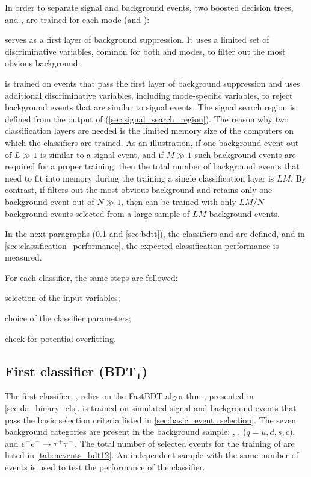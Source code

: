 In order to separate signal and background events, two boosted decision trees, \bdto and \bdtt, are trained for each mode (\BKpnn and \BKznn):
\bi
\item \bdto serves as a first layer of background suppression.
It uses a limited set of discriminative variables, common for both \BKpnn and \BKznn modes, to filter out the most obvious background.
\item \bdtt is trained on events that pass the first layer of background suppression and uses additional discriminative variables, including mode-specific variables, to reject background events that are similar to signal events.
The signal search region is defined from the output of \bdtt (\cref{sec:signal_search_region}).
\ei
The reason why two classification layers are needed is the limited memory size of the computers on which the classifiers are trained.
As an illustration, if one background event out of $L\gg1$ is similar to a signal event, and if $M\gg1$ such background events are required for a proper training, then the total number of background events that need to fit into memory during the training a single classification layer is $LM$.
By contrast, if \bdto filters out the most obvious background and retains only one background event out of $N\gg1$, then \bdtt can be trained with only $LM/N$ background events selected from a large sample of $LM$ background events.

In the next paragraphs (\cref{sec:bdto} and \cref{sec:bdtt}), the classifiers \bdto and \bdtt are defined, and in \cref{sec:classification_performance}, the expected classification performance is measured.

For each classifier, the same steps are followed:
\bi
\item selection of the input variables;
\item choice of the classifier parameters;
\item check for potential overfitting.
\ei
\subsection[First classifier (\bdto)]{First classifier (BDT$\mathbf{_1}$)} \label{sec:bdto}
The first classifier, \bdto, relies on the FastBDT algorithm \cite{Keck:2017gsv}, presented in \cref{sec:da_binary_cls}.
\bdto is trained on simulated signal and background events that pass the basic selection criteria listed in \cref{sec:basic_event_selection}.
The seven background categories are present in the background sample: \epem\to\BpBm, \epem\to\BzBzb, \epem\to\qqbar ($q=u,d,s,c$), and  $e^+e^-\rightarrow\tau^+\tau^-$.
The total number of selected events for the training of \bdto are listed in \cref{tab:nevents_bdt12}.
An independent sample with the same number of events is used to test the performance of the classifier.

